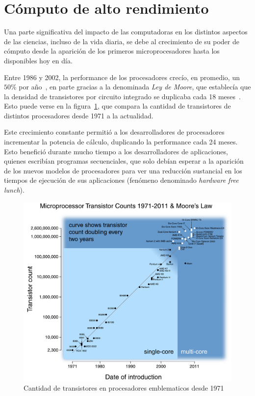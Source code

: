 \section{C\'omputo de alto rendimiento}

Una parte significativa del impacto de las computadoras en los distintos aspectos de las ciencias, incluso de la vida diaria, se debe al crecimiento de su poder de c\'omputo desde la aparici\'on de los primeros microprocesadores hasta los disponibles hoy en d\'ia.

Entre 1986 y 2002, la performance de los procesadores crec\'io, en promedio, un $50\%$ por a\~no~\cite{Pacheco}, en parte gracias a la denominada \textit{Ley de Moore}, que
establec\'ia que la densidad de transistores por circuito integrado se duplicaba cada 18 meses~\cite{HennessyPatterson}. 
Esto puede verse en la figura~\ref{moore-law}, que compara la cantidad de transistores de distintos procesadores desde 1971 a la actualidad.

Este crecimiento constante permiti\'o a los desarrolladores de procesadores incrementar la potencia de c\'alculo, duplicando la performance cada 24 meses. 
Esto benefici\'o durante mucho tiempo a los desarrolladores de aplicaciones, quienes escrib\'ian programas secuenciales, que solo deb\'ian esperar a la aparici\'on de los nuevos modelos de procesadores para ver una reducci\'on sustancial en los tiempos de ejecuci\'on de sus aplicaciones (fen\'omeno denominado \textit{hardware free lunch}).

\begin{figure}[htbp]
   \centering
   \includegraphics[width=\textwidth]{images/moore-law.pdf}
   \caption{Cantidad de transistores en procesadores emblematicos desde 1971}
   \label{moore-law}
\end{figure}


